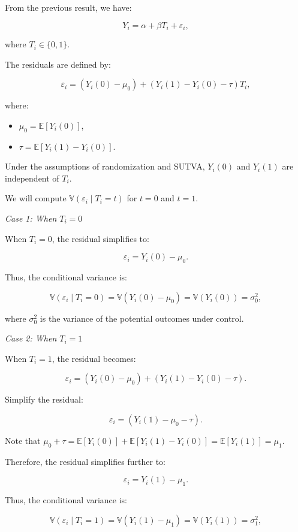 \documentclass{article}
\begin{document}
From the previous result, we have:

\[
Y_i = \alpha + \beta T_i + \varepsilon_i,
\]

where \(T_i \in \{0, 1\}\).

The residuals are defined by:

\[
\varepsilon_i = \left( Y_i(0) - \mu_0 \right) + \left( Y_i(1) - Y_i(0) - \tau \right) T_i,
\]

where:
\begin{itemize}
  \item \(\mu_0 = \mathbb{E}[Y_i(0)]\),
  \item \(\tau = \mathbb{E}[Y_i(1) - Y_i(0)]\).
\end{itemize}  

Under the assumptions of randomization and SUTVA, \(Y_i(0)\) and \(Y_i(1)\) are independent of \(T_i\).

We will compute \(\mathbb{V}(\varepsilon_i \mid T_i = t)\) for \(t = 0\) and \(t = 1\).

\textit{Case 1: When \(T_i = 0\)}

When \(T_i = 0\), the residual simplifies to:

\[
\varepsilon_i = Y_i(0) - \mu_0.
\]

Thus, the conditional variance is:

\[
\mathbb{V}(\varepsilon_i \mid T_i = 0) = \mathbb{V}(Y_i(0) - \mu_0) = \mathbb{V}(Y_i(0)) = \sigma_0^2,
\]

where \(\sigma_0^2\) is the variance of the potential outcomes under control.

\textit{Case 2: When \(T_i = 1\)}

When \(T_i = 1\), the residual becomes:

\[
\varepsilon_i = \left( Y_i(0) - \mu_0 \right) + \left( Y_i(1) - Y_i(0) - \tau \right).
\]

Simplify the residual:

\[
\varepsilon_i = \left( Y_i(1) - \mu_0 - \tau \right).
\]

Note that \(\mu_0 + \tau = \mathbb{E}[Y_i(0)] + \mathbb{E}[Y_i(1) - Y_i(0)] = \mathbb{E}[Y_i(1)] = \mu_1\).

Therefore, the residual simplifies further to:

\[
\varepsilon_i = Y_i(1) - \mu_1.
\]

Thus, the conditional variance is:

\[
\mathbb{V}(\varepsilon_i \mid T_i = 1) = \mathbb{V}(Y_i(1) - \mu_1) = \mathbb{V}(Y_i(1)) = \sigma_1^2,
\]
\end{document}

